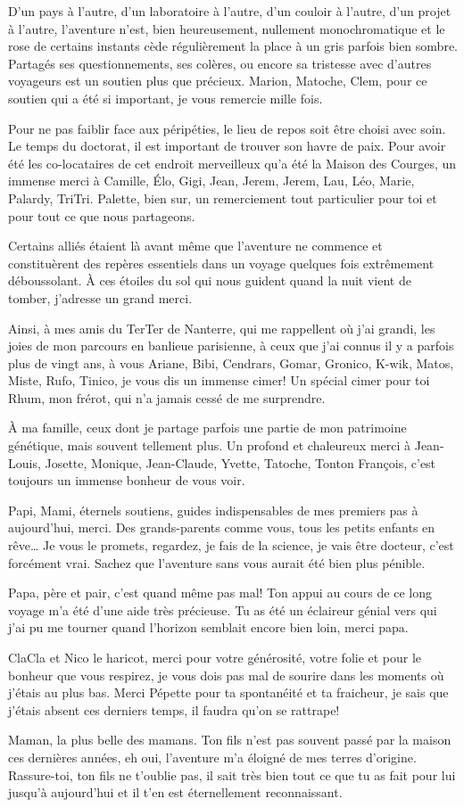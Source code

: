 D'un pays à l'autre, d'un laboratoire à l'autre, d'un couloir à l'autre,
d'un projet à l'autre, l'aventure n'est, bien heureusement, nullement
monochromatique et le rose de certains instants cède régulièrement la
place à un gris parfois bien sombre. Partagés ses questionnements, ses
colères, ou encore sa tristesse avec d'autres voyageurs est un soutien
plus que précieux. Marion, Matoche, Clem, pour ce soutien qui a été si
important, je vous remercie mille fois.

Pour ne pas faiblir face aux péripéties, le lieu de repos soit être
choisi avec soin. Le temps du doctorat, il est important de trouver son
havre de paix. Pour avoir été les co-locataires de cet endroit
merveilleux qu'a été la Maison des Courges, un immense merci à Camille,
Élo, Gigi, Jean, Jerem, Jerem, Lau, Léo, Marie, Palardy, TriTri.
Palette, bien sur, un remerciement tout particulier pour toi et pour
tout ce que nous partageons.

Certains alliés étaient là avant même que l'aventure ne commence et
constituèrent des repères essentiels dans un voyage quelques fois
extrêmement déboussolant. À ces étoiles du sol qui nous guident quand la
nuit vient de tomber, j'adresse un grand merci.

Ainsi, à mes amis du TerTer de Nanterre, qui me rappellent où j'ai
grandi, les joies de mon parcours en banlieue parisienne, à ceux que
j'ai connus il y a parfois plus de vingt ans, à vous Ariane, Bibi,
Cendrars, Gomar, Gronico, K-wik, Matos, Miste, Rufo, Tinico, je vous dis
un immense cimer! Un spécial cimer pour toi Rhum, mon frérot, qui n'a
jamais cessé de me surprendre.

À ma famille, ceux dont je partage parfois une partie de mon patrimoine
génétique, mais souvent tellement plus. Un profond et chaleureux merci à
Jean-Louis, Josette, Monique, Jean-Claude, Yvette, Tatoche, Tonton
François, c'est toujours un immense bonheur de vous voir.

Papi, Mami, éternels soutiens, guides indispensables de mes premiers pas
à aujourd'hui, merci. Des grands-parents comme vous, tous les petits
enfants en rêve\ldots{} Je vous le promets, regardez, je fais de la
science, je vais être docteur, c'est forcément vrai. Sachez que
l'aventure sans vous aurait été bien plus pénible.

Papa, père et pair, c'est quand même pas mal! Ton appui au cours de ce
long voyage m'a été d'une aide très précieuse. Tu as été un éclaireur
génial vers qui j'ai pu me tourner quand l'horizon semblait encore bien
loin, merci papa.

ClaCla et Nico le haricot, merci pour votre générosité, votre folie et
pour le bonheur que vous respirez, je vous dois pas mal de sourire dans
les moments où j'étais au plus bas. Merci Pépette pour ta spontanéité et
ta fraicheur, je sais que j'étais absent ces derniers temps, il faudra
qu'on se rattrape!

Maman, la plus belle des mamans. Ton fils n'est pas souvent passé par la
maison ces dernières années, eh oui, l'aventure m'a éloigné de mes
terres d'origine. Rassure-toi, ton fils ne t'oublie pas, il sait très
bien tout ce que tu as fait pour lui jusqu'à aujourd'hui et il t'en est
éternellement reconnaissant.
